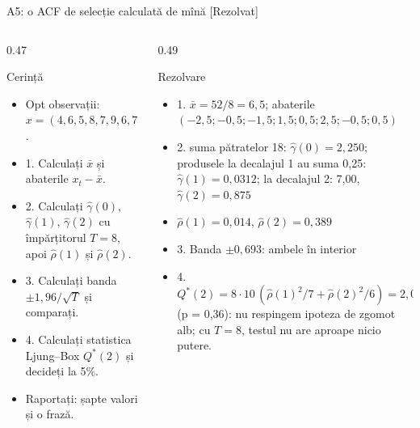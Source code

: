 \begin{frame}{A5: o ACF de selecție calculată de mînă [Rezolvat]}
\itemsize{\scriptsize}
\begin{columns}[T]
\begin{column}{0.47\textwidth}
\begin{block}{Cerință}
\begin{itemize}
    \item Opt observații: $x = (4, 6, 5, 8, 7, 9, 6, 7)$.
    \item 1. Calculați $\bar x$ și abaterile $x_t - \bar x$.
    \item 2. Calculați $\hat\gamma(0)$, $\hat\gamma(1)$, $\hat\gamma(2)$ cu împărțitorul $T = 8$, apoi $\hat\rho(1)$ și $\hat\rho(2)$.
    \item 3. Calculați banda $\pm 1{,}96/\sqrt{T}$ și comparați.
    \item 4. Calculați statistica Ljung--Box $Q^*(2)$ și decideți la 5\%.
    \item Raportați: șapte valori și o frază.
\end{itemize}
\end{block}
\end{column}
\begin{column}{0.49\textwidth}
\begin{exampleblock}{Rezolvare}
\begin{itemize}
    \item 1. $\bar x = 52/8 = 6{,}5$; abaterile $(-2{,}5; -0{,}5; -1{,}5; 1{,}5; 0{,}5; 2{,}5; -0{,}5; 0{,}5)$
    \item 2. suma pătratelor 18: $\hat\gamma(0) = 2{,}250$; produsele la decalajul 1 au suma 0{,}25: $\hat\gamma(1) = 0{,}0312$; la decalajul 2: 7{,}00, $\hat\gamma(2) = 0{,}875$
    \item $\hat\rho(1) = 0{,}014$, $\hat\rho(2) = 0{,}389$
    \item 3. Banda $\pm 0{,}693$: ambele în interior
    \item 4. $Q^*(2) = 8 \cdot 10\,(\hat\rho(1)^2/7 + \hat\rho(2)^2/6) = 2{,}02 < 5{,}99$ (p = 0{,}36): nu respingem ipoteza de zgomot alb; cu $T = 8$, testul nu are aproape nicio putere.
\end{itemize}
\end{exampleblock}
\end{column}
\end{columns}
\end{frame}

